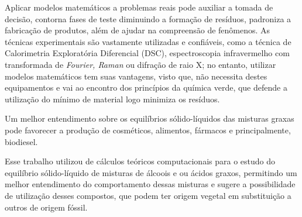 Aplicar modelos matemáticos a problemas reais pode auxiliar a tomada de decisão, contorna fases de teste diminuindo a formação de resíduos, padroniza a fabricação de produtos, além de ajudar na compreensão de fenômenos. As técnicas experimentais são vastamente utilizadas e confiáveis, como a técnica de Calorimetria Exploratória Diferencial (DSC), espectroscopia infravermelho com transformada de \textit{Fourier, Raman} ou difração de raio X; no entanto, utilizar modelos matemáticos tem suas vantagens, visto que, não necessita destes equipamentos e vai ao encontro dos princípios da química verde, que defende a utilização do mínimo de material logo minimiza os resíduos.\cite{DeMarco2019,Prausnitz,Goulart2019}

Um melhor entendimento sobre os equilíbrios sólido-líquidos das misturas graxas pode favorecer a produção de cosméticos, alimentos, fármacos e principalmente, biodiesel. \cite{Rocha2011,Leggieri2018a,Costa2007,Wei2009,Boudouh2016,Costa2012,Costa2009}

Esse trabalho utilizou de cálculos teóricos computacionais para o estudo do equilíbrio sólido-líquido de misturas de álcoois e ou ácidos graxos, permitindo um melhor entendimento do comportamento dessas misturas e sugere a possibilidade de utilização desses compostos, que podem ter origem vegetal em substituição a outros de origem fóssil.
